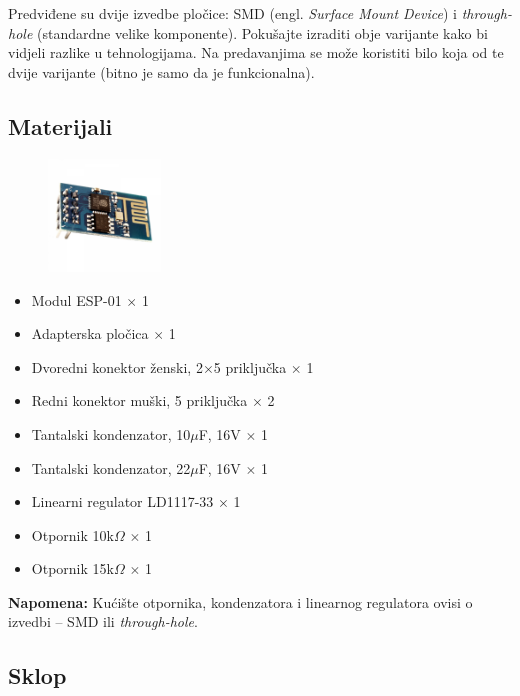 \documentclass[times, utf8, zavrsni, numeric, sort]{fer}
\begin{document}
Predviđene su dvije izvedbe pločice: SMD (engl. \textit{Surface Mount Device}) i \textit{through-hole} (standardne velike komponente). Pokušajte izraditi obje varijante kako bi vidjeli razlike u tehnologijama. Na predavanjima se može koristiti bilo koja od te dvije varijante (bitno je samo da je funkcionalna).

\subsection{Materijali}

\begin{figure}[h!]
	\centering
	\includegraphics[width=3cm]{./Fotke/ESP8266/Materijal.jpg}
	\label{fig:slika1}
\end{figure}

\begin{itemize}
	\setlength{\itemsep}{0pt}
	\setlength{\parskip}{0pt}
	
	\item Modul ESP-01 $\times$ 1
	\item Adapterska pločica $\times$ 1
	\item Dvoredni konektor ženski, 2$\times$5 priključka $\times$ 1
	\item Redni konektor muški, 5 priključka $\times$ 2
	\item Tantalski kondenzator, 10$\mu$F, 16V $\times$ 1
	\item Tantalski kondenzator, 22$\mu$F, 16V $\times$ 1
	\item Linearni regulator LD1117-33 $\times$ 1
	\item Otpornik 10k$\Omega$ $\times$ 1
	\item Otpornik 15k$\Omega$ $\times$ 1
\end{itemize}

\textbf{Napomena:} Kućište otpornika, kondenzatora i linearnog regulatora ovisi o izvedbi -- SMD ili \textit{through-hole}.

\subsection{Sklop}
\end{document}
